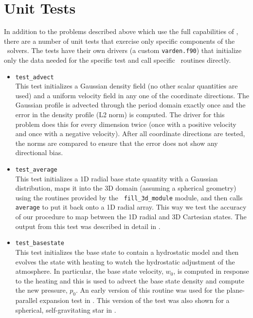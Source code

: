 \section{Unit Tests}

\label{sec:unit_tests}

In addition to the problems described above which use the full
capabilities of \maestro, there are a number of unit tests that
exercise only specific components of the \maestro\ solvers.  The
tests have their own drivers (a custom {\tt varden.f90}) that
initialize only the data needed for the specific test and call
specific \maestro\ routines directly.

\begin{itemize}
\item {\tt test\_advect} \\[-3mm]

  This test initializes a Gaussian density field (no other scalar
  quantities are used) and a uniform velocity field in any one of the
  coordinate directions.  The Gaussian profile is advected through
  the period domain exactly once and the error in the density profile
  (L2 norm) is computed.  The driver for this problem does this 
  for every dimension twice (once with a positive velocity and once
  with a negative velocity).  After all coordinate directions are 
  tested, the norms are compared to ensure that the error does
  not show any directional bias.


\item {\tt test\_average} \\[-3mm]

  This test initializes a 1D radial base state quantity with a
  Gaussian distribution, maps it into the 3D domain (assuming a
  spherical geometry) using the routines provided by the {\tt
    fill\_3d\_module} module, and then calls {\tt average} to put it
  back onto a 1D radial array.  This way we test the accuracy of our
  procedure to map between the 1D radial and 3D Cartesian states.
  The output from this test was described in detail in
  \cite{multilevel}.

\item {\tt test\_basestate} \\[-3mm]

  This test initializes the base state to contain a hydrostatic
  model and then evolves the state with heating to watch the 
  hydrostatic adjustment of the atmosphere.  In particular,
  the base state velocity, $w_0$, is computed in response to 
  the heating and this is used to advect the base state density
  and compute the new pressure, $p_0$.  An early version of 
  this routine was used for the plane-parallel expansion test
  in \cite{lowMach2}.  This version of the test was also shown
  for a spherical, self-gravitating star in \cite{multilevel}.


\end{itemize}
